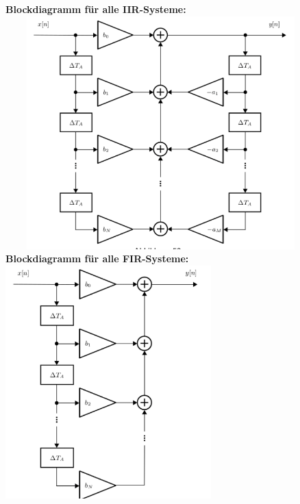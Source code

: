 \documentclass[12pt,a4paper]{scrartcl}
\begin{document}
  \noindent \textbf{Blockdiagramm für alle IIR-Systeme:} \\
  \includegraphics[height=9cm,width=12cm]{Pictures/IIR.png} \\

  \noindent \textbf{Blockdiagramm für alle FIR-Systeme:} \\
  \includegraphics[height=9cm]{Pictures/FIR.png} \\
\end{document}
